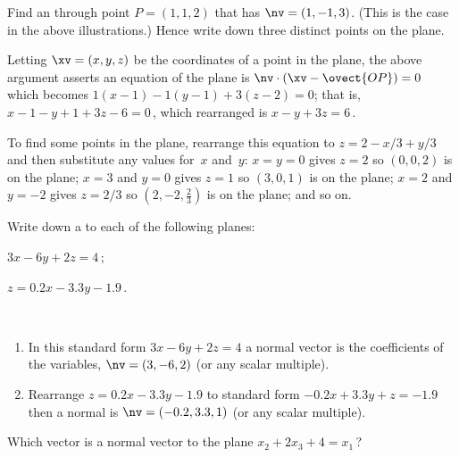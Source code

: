 \begin{example} 
Find an  through point \(P=(1,1,2)\) that has  \(\nv=(1,-1,3)\).
(This is the case in the above illustrations.)
Hence write down three distinct points on the plane.
\begin{solution} 
Letting \(\xv=(x,y,z)\) be the coordinates of a point in the plane, the above argument asserts an equation of the plane is \(\nv\cdot(\xv-\ovect{OP})=0\) which becomes
\(1(x-1)-1(y-1)+3(z-2)=0\); that is, \(x-1-y+1+3z-6=0\)\,, which rearranged is \(x-y+3z=6\)\,. 

To find some points in the plane, rearrange this equation to \(z=2-x/3+y/3\) and then substitute any values for~\(x\) and~\(y\):  
\(x=y=0\) gives \(z=2\) so \((0,0,2)\) is on the plane; 
\(x=3\) and \(y=0\) gives \(z=1\) so \((3,0,1)\) is on the plane;
\(x=2\) and \(y=-2\) gives \(z=2/3\) so \((2,-2,\frac23)\) is on the plane; and so on.
\end{solution}
\end{example}






\begin{example} 
Write down a  to each of the following planes:
\begin{Parts}
\item \(3x-6y+2z=4\)\,;
\item \(z=0.2x-3.3y-1.9\)\,.
\end{Parts}
\begin{solution} \ 
\begin{enumerate}
\item In this standard form \(3x-6y+2z=4\) a normal vector is the coefficients of the variables, \(\nv=(3,-6,2)\) (or any scalar multiple).
\item Rearrange \(z=0.2x-3.3y-1.9\) to standard form \(-0.2x+3.3y+z=-1.9\) then a normal is \(\nv=(-0.2,3.3,1)\) (or any scalar multiple).
\aqed

\end{enumerate} 
\end{solution}
\end{example}





\begin{activity}
Which vector is a normal vector to the plane \(x_2+2x_3+4=x_1\)\,?
\actposs[4]{\((-1,1,2)\)}{\((1,2,1)\)}{\((1,2,4)\)}{none of these}
\end{activity}





